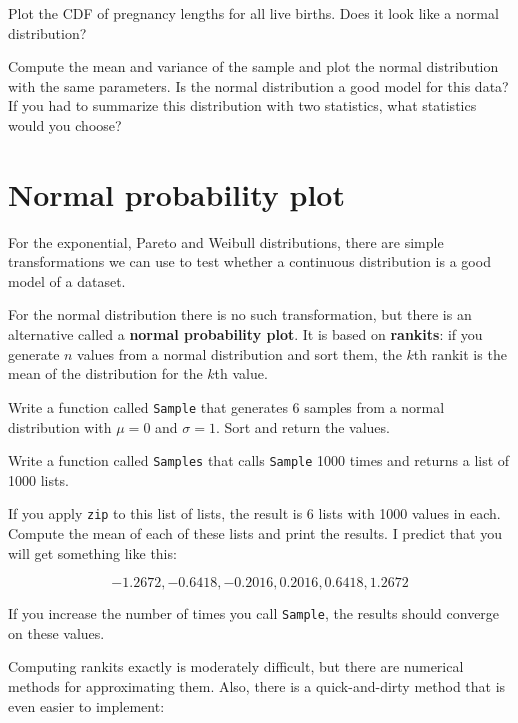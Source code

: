 \documentclass[12pt]{book}
\begin{document}
\begin{ex}

Plot the CDF of pregnancy lengths for all live births.  Does it
look like a normal distribution?

Compute the mean and variance of the sample and plot the normal
distribution with the same parameters.  Is the normal distribution a
good model for this data?  If you had to summarize this distribution
with two statistics, what statistics would you choose?

\end{ex}


\section{Normal probability plot}

For the exponential, Pareto and Weibull distributions, there are
simple transformations we can use to test whether a continuous
distribution is a good model of a dataset.

For the normal distribution there is no such transformation, but there
is an alternative called a {\bf normal probability plot}.  It is based
on {\bf rankits}: if you generate $n$ values from a normal
distribution and sort them, the $k$th rankit is the mean of the
distribution for the $k$th value.

\begin{ex}

Write a function called {\tt Sample} that generates 6 samples from a
normal distribution with $\mu = 0$ and $\sigma = 1$.  Sort and return
the values.

Write a function called {\tt Samples} that calls {\tt Sample} 1000 times and
returns a list of 1000 lists.

If you apply {\tt zip} to this list of lists, the result is 6 lists
with 1000 values in each.  Compute the mean of each of these lists
and print the results.  I predict that you will get something like
this:

\[ -1.2672,   -0.6418,   -0.2016,   0.2016,   0.6418,   1.2672 \]

If you increase the number of times you call {\tt Sample}, the
results should converge on these values.

\end{ex}


Computing rankits exactly is moderately difficult, but there are
numerical methods for approximating them.  Also, there is a
quick-and-dirty method that is even easier to implement:
\end{document}
